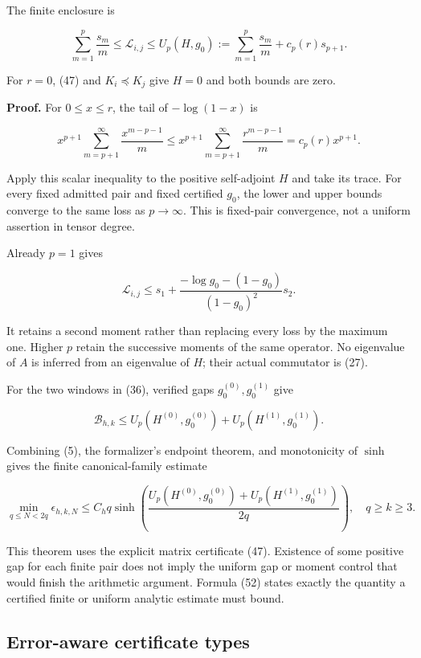 \documentclass[
  11pt,
]{article}
\begin{document}
The finite enclosure is

\[
 \boxed{
 \sum_{m=1}^p\frac{s_m}{m}
 \le\mathcal L_{i,j}
 \le U_p(H,g_0):=
 \sum_{m=1}^p\frac{s_m}{m}+c_p(r)s_{p+1}.}                        \tag{49}
\]

For \(r=0\), (47) and \(K_i\preceq K_j\) give \(H=0\) and both bounds
are zero.

\textbf{Proof.} For \(0\le x\le r\), the tail of \(-\log(1-x)\) is

\[
 x^{p+1}\sum_{m=p+1}^\infty\frac{x^{m-p-1}}m
 \le x^{p+1}\sum_{m=p+1}^\infty\frac{r^{m-p-1}}m
 =c_p(r)x^{p+1}.
\]

Apply this scalar inequality to the positive self-adjoint \(H\) and take
its trace. For every fixed admitted pair and fixed certified \(g_0\),
the lower and upper bounds converge to the same loss as \(p\to\infty\).
This is fixed-pair convergence, not a uniform assertion in tensor
degree.

Already \(p=1\) gives

\[
 \mathcal L_{i,j}\le s_1+
 \frac{-\log g_0-(1-g_0)}{(1-g_0)^2}s_2.                          \tag{50}
\]

It retains a second moment rather than replacing every loss by the
maximum one. Higher \(p\) retain the successive moments of the same
operator. No eigenvalue of \(A\) is inferred from an eigenvalue of
\(H\); their actual commutator is (27).

For the two windows in (36), verified gaps \(g_0^{(0)},g_0^{(1)}\) give

\[
 \boxed{\mathcal B_{h,k}\le
 U_p(H^{(0)},g_0^{(0)})+U_p(H^{(1)},g_0^{(1)}).}                   \tag{51}
\]

Combining (5), the formalizer's endpoint theorem, and monotonicity of
\(\sinh\) gives the finite canonical-family estimate

\[
 \boxed{
 \min_{q\le N<2q}\epsilon_{h,k,N}
 \le C_hq\sinh\!\left(
 \frac{U_p(H^{(0)},g_0^{(0)})+U_p(H^{(1)},g_0^{(1)})}{2q}
 \right),\quad q\ge k\ge3.}                                     \tag{52}
\]

This theorem uses the explicit matrix certificate (47). Existence of
some positive gap for each finite pair does not imply the uniform gap or
moment control that would finish the arithmetic argument. Formula (52)
states exactly the quantity a certified finite or uniform analytic
estimate must bound.

\subsection{Error-aware certificate
types}\label{error-aware-certificate-types}
\end{document}
